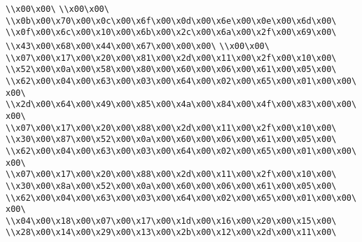 \verb|\\x00\x00\|\newline
\verb|\\x00\x00\|\newline
\verb|\\x0b\x00\x70\x00\x0c\x00\x6f\x00\x0d\x00\x6e\x00\x0e\x00\x6d\x00\|\newline
\verb|\\x0f\x00\x6c\x00\x10\x00\x6b\x00\x2c\x00\x6a\x00\x2f\x00\x69\x00\|\newline
\verb|\\x43\x00\x68\x00\x44\x00\x67\x00\x00\x00\|\newline
\verb|\\x00\x00\|\newline
\verb|\\x07\x00\x17\x00\x20\x00\x81\x00\x2d\x00\x11\x00\x2f\x00\x10\x00\|\newline
\verb|\\x52\x00\x0a\x00\x58\x00\x80\x00\x60\x00\x06\x00\x61\x00\x05\x00\|\newline
\verb|\\x62\x00\x04\x00\x63\x00\x03\x00\x64\x00\x02\x00\x65\x00\x01\x00\x00\x00\|\newline
\verb|\\x2d\x00\x64\x00\x49\x00\x85\x00\x4a\x00\x84\x00\x4f\x00\x83\x00\x00\x00\|\newline
\verb|\\x07\x00\x17\x00\x20\x00\x88\x00\x2d\x00\x11\x00\x2f\x00\x10\x00\|\newline
\verb|\\x30\x00\x87\x00\x52\x00\x0a\x00\x60\x00\x06\x00\x61\x00\x05\x00\|\newline
\verb|\\x62\x00\x04\x00\x63\x00\x03\x00\x64\x00\x02\x00\x65\x00\x01\x00\x00\x00\|\newline
\verb|\\x07\x00\x17\x00\x20\x00\x88\x00\x2d\x00\x11\x00\x2f\x00\x10\x00\|\newline
\verb|\\x30\x00\x8a\x00\x52\x00\x0a\x00\x60\x00\x06\x00\x61\x00\x05\x00\|\newline
\verb|\\x62\x00\x04\x00\x63\x00\x03\x00\x64\x00\x02\x00\x65\x00\x01\x00\x00\x00\|\newline
\verb|\\x04\x00\x18\x00\x07\x00\x17\x00\x1d\x00\x16\x00\x20\x00\x15\x00\|\newline
\verb|\\x28\x00\x14\x00\x29\x00\x13\x00\x2b\x00\x12\x00\x2d\x00\x11\x00\|\newline
